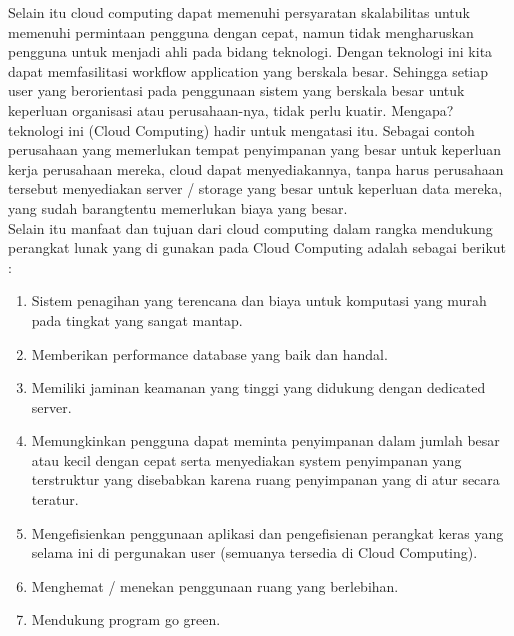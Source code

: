 \tab Selain itu cloud computing dapat memenuhi persyaratan skalabilitas untuk memenuhi permintaan pengguna dengan cepat, namun tidak mengharuskan pengguna untuk menjadi ahli pada bidang teknologi. Dengan teknologi ini kita dapat memfasilitasi workflow application yang berskala besar. Sehingga setiap user yang berorientasi pada penggunaan sistem yang berskala besar untuk keperluan organisasi atau perusahaan-nya, tidak perlu kuatir. Mengapa? teknologi ini (Cloud Computing) hadir untuk mengatasi itu. Sebagai contoh perusahaan yang memerlukan tempat penyimpanan yang besar untuk keperluan kerja perusahaan mereka, cloud dapat menyediakannya, tanpa harus perusahaan tersebut menyediakan server / storage yang besar untuk keperluan data mereka, yang sudah barangtentu memerlukan biaya yang besar. \\Selain itu manfaat dan tujuan dari cloud computing dalam rangka mendukung perangkat lunak yang di gunakan pada Cloud Computing adalah sebagai berikut :
\begin{enumerate}
\item Sistem penagihan yang terencana dan biaya untuk komputasi yang murah pada tingkat yang sangat mantap.
\item Memberikan performance database yang baik dan handal.
\item Memiliki jaminan keamanan yang tinggi yang didukung dengan dedicated server.
\item Memungkinkan pengguna dapat meminta penyimpanan dalam jumlah besar atau kecil dengan cepat serta menyediakan system penyimpanan yang terstruktur yang disebabkan karena ruang penyimpanan yang di atur secara teratur.
\item Mengefisienkan penggunaan aplikasi dan pengefisienan perangkat keras yang selama ini di pergunakan user (semuanya tersedia di Cloud Computing).
\item Menghemat / menekan penggunaan ruang yang berlebihan.
\item Mendukung program go green.
\end{enumerate}
